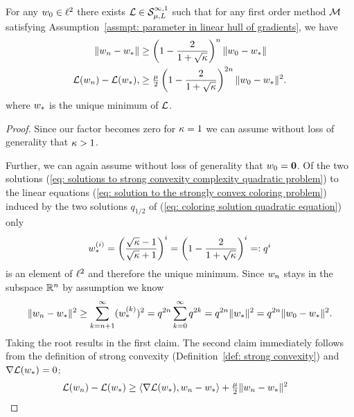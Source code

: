 \begin{theorem}
	\label{thm: strong convexity complexity bound}
	For any \(\weights_0\in\sequenceSpace\) there exists
	\(\Loss\in\strongConvex[\infty,1]{\lbound}{\ubound}\) such that for any
	first order method \(\firstOrderMethod\) satisfying Assumption~\ref{assmpt:
	parameter in linear hull of gradients}, we have
	\begin{subequations}
	\begin{align}
		\|\weights_n - \minimum\|
		&\ge \left(1-\frac2{1+\sqrt{\condition}}\right)^n \|\weights_0 - \minimum\| \\
		\Loss(\weights_n) - \Loss(\minimum),
		&\ge \tfrac{\lbound}{2}
		\left(1-\frac2{1+\sqrt{\condition}}\right)^{2n} \|\weights_0 - \minimum\|^2.
	\end{align}
	\end{subequations}
	where \(\minimum\) is the unique minimum of \(\Loss\).
\end{theorem}
\begin{proof}
	Since our factor becomes zero for \(\condition=1\) we can assume without loss
	of generality that \(\condition>1\).
	
	Further, we can again assume without loss of generality that
	\(\weights_0=\mathbf{0}\). Of the two solutions (\ref{eq: solutions to
	strong convexity complexity quadratic problem}) to the linear equations
	(\ref{eq: solution to the strongly convex coloring problem}) induced by the
	two solutions \(q_{1/2}\) of (\ref{eq: coloring solution quadratic equation})
	only
	\begin{align*}
		\minimum^{(i)} = \left(\frac{\sqrt{\condition}-1}{\sqrt{\condition}+1}\right)^i
		= \left(1 - \frac{2}{1+\sqrt{\condition}}\right)^i =: q^i
	\end{align*}
	is an element of \(\sequenceSpace\) and therefore the unique minimum. Since 
	\(\weights_n\) stays in the subspace \(\reals^n\) by assumption we know
	\begin{align*}
		\|\weights_n -\minimum\|^2
		\ge \sum_{k=n+1}^\infty (\minimum^{(k)})^2
		= q^{2n} \sum_{k=0}^\infty q^{2k}
		= q^{2n} \| \minimum\|^2
		= q^{2n} \|\weights_0 - \minimum\|^2.
	\end{align*}
	Taking the root results in the first claim. The second claim immediately
	follows from the definition of strong convexity (Definition~\ref{def: strong convexity})
	and \(\nabla\Loss(\minimum) = 0\):
	\begin{align*}
		\Loss(\weights_n) - \Loss(\minimum)
		&\ge \langle \nabla\Loss(\minimum), \weights_n -\minimum\rangle
		+\tfrac\lbound{2} \|\weights_n -\minimum\|^2
		\qedhere
	\end{align*}
\end{proof}

